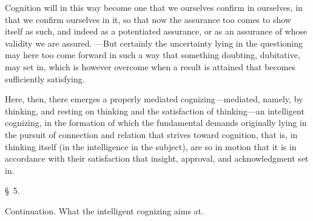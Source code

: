 \documentclass[12pt,a4paper]{book}
\begin{document}
Cognition will in this way become one that we ourselves confirm in ourselves, in
that we confirm ourselves in it, so that now the assurance too comes to show itself
as such, and indeed as a potentiated assurance, or as an assurance of whose
validity we are assured. ---But certainly the uncertainty lying in the questioning
may here too come forward in such a way that something doubting, dubitative, may
set in, which is however overcome when a result is attained that becomes
sufficiently satisfying.

Here, then, there emerges a properly mediated cognizing---mediated, namely, by
thinking, and resting on thinking and the satisfaction of thinking---an intelligent
cognizing, in the formation of which the fundamental demands originally lying in
the pursuit of connection and relation that strives toward cognition, that is, in
thinking itself (in the intelligence in the subject), are so in motion that it is
in accordance with their satisfaction that insight, approval, and acknowledgment
set in.

\begin{center}\large\S~5.\end{center}
\begin{center}Continuation. What the intelligent cognizing aims at.\end{center}
\end{document}
